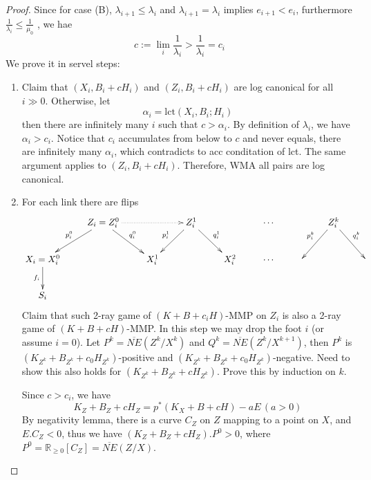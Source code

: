\documentclass{article}
\begin{document}
\begin{proof}
Since for case (B), $ \lambda_{i+1}\leqslant \lambda_i $ and $ \lambda_{i+1}=\lambda_i $ implies $ e_{i+1}<e_i $, furthermore $ \frac{1}{\lambda_i}\leqslant \frac{1}{\mu_0} $ , we hae
$$ c:=\lim_{i}\frac{1}{\lambda_i}>\frac{1}{\lambda_i}=c_i $$
We prove it in servel steps:
\begin{enumerate}[Step 1]
\item Claim that $ (X_i,B_i+cH_i) $ and $ (Z_i,B_i+cH_i) $ are log canonical for all $ i\gg 0 $. Otherwise, let
$$ \alpha_i=\mathrm{lct}(X_i,B_i;H_i) $$
then there are infinitely many $ i $ such that $ c>\alpha_i $. By definition of $ \lambda_i $, we have $ \alpha_i>c_i $. Notice that $ c_i $ accumulates from below to $ c $ and never equals, there are infinitely many $ \alpha_i $, which contradicts to acc conditation of lct. The same argument applies to $ (Z_i,B_i+cH_i) $. Therefore, WMA all pairs are log canonical.
\item For each link there are flips
$$ \xymatrix{
&Z_i=Z_i^0\ar[ld]_{p^0_i}\ar[dr]^{q^0_i}\ar@{.>}[rr]&&Z_i^1\ar[ld]_{p^1_i}\ar[rd]^{q^1_i}&&\cdots&&Z_i^k\ar[ld]_{p^k_i}\ar[dr]^{q^k_i}\\
X_i=X^0_i\ar[d]_{f_i} &&X^1_i&&X_i^2&\cdots&&&\\
S_i }$$
Claim that such 2-ray game of $ (K+B+c_iH) $-MMP on $ Z_i $ is also a 2-ray game of $ (K+B+cH) $-MMP. In this step we may drop the foot $ i $ (or assume $ i=0 $). Let $ P^k=\overline{NE}(Z^k/X^k) $ and $ Q^k=\overline{NE}(Z^k/X^{k+1}) $, then $ P^k $ is $ (K_{Z^k}+B_{Z^k}+c_0H_{Z^k}) $-positive and $ (K_{Z^k}+B_{Z^k}+c_0H_{Z^k}) $-negative. Need to show this also holds for $ (K_{Z^k}+B_{Z^k}+cH_{Z^k}) $. Prove this by induction on $ k $.

Since $ c>c_i $, we have 
$$ K_Z+B_Z+cH_Z=p^*(K_X+B+cH)-aE\,(a>0) $$
By negativity lemma, there is a curve $ C_Z $ on $ Z $ mapping to a point on $ X $, and $ E.C_Z<0 $, thus we have $ (K_Z+B_Z+cH_Z).P^0>0 $, where $ P^0=\mathbb{R}_{\geqslant0}[C_Z]=\overline{NE}(Z/X) $.


\end{enumerate}
\end{proof}
\end{document}
